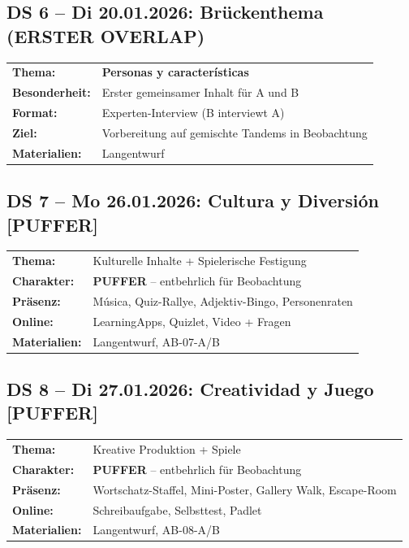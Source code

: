 \documentclass[11pt, a4paper]{article}
\begin{document}
\vspace{0.5cm}

\subsection*{DS 6 -- Di 20.01.2026: Brückenthema (ERSTER OVERLAP)}

\begin{tabular}{ll}
\textbf{Thema:} & \textbf{Personas y características} \\
\textbf{Besonderheit:} & Erster gemeinsamer Inhalt für A und B \\
\textbf{Format:} & Experten-Interview (B interviewt A) \\
\textbf{Ziel:} & Vorbereitung auf gemischte Tandems in Beobachtung \\
\textbf{Materialien:} & Langentwurf \\
\end{tabular}

\newpage

\subsection*{DS 7 -- Mo 26.01.2026: Cultura y Diversión [PUFFER]}

\begin{tabular}{ll}
\textbf{Thema:} & Kulturelle Inhalte + Spielerische Festigung \\
\textbf{Charakter:} & \textcolor{warning}{\textbf{PUFFER}} -- entbehrlich für Beobachtung \\
\textbf{Präsenz:} & Música, Quiz-Rallye, Adjektiv-Bingo, Personenraten \\
\textbf{Online:} & LearningApps, Quizlet, Video + Fragen \\
\textbf{Materialien:} & Langentwurf, AB-07-A/B \\
\end{tabular}

\vspace{0.5cm}

\subsection*{DS 8 -- Di 27.01.2026: Creatividad y Juego [PUFFER]}

\begin{tabular}{ll}
\textbf{Thema:} & Kreative Produktion + Spiele \\
\textbf{Charakter:} & \textcolor{warning}{\textbf{PUFFER}} -- entbehrlich für Beobachtung \\
\textbf{Präsenz:} & Wortschatz-Staffel, Mini-Poster, Gallery Walk, Escape-Room \\
\textbf{Online:} & Schreibaufgabe, Selbsttest, Padlet \\
\textbf{Materialien:} & Langentwurf, AB-08-A/B \\
\end{tabular}
\end{document}
